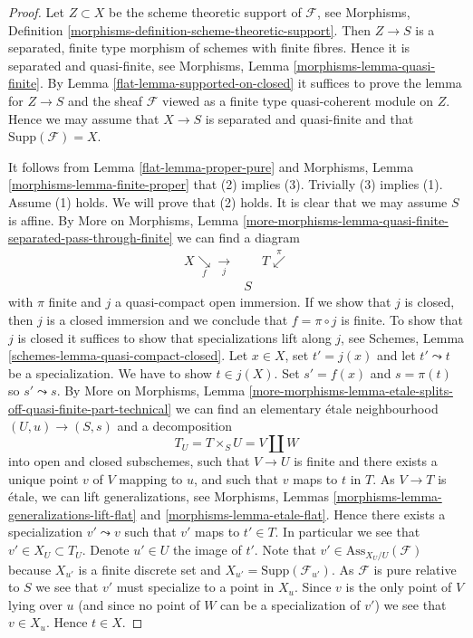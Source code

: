 \begin{proof}

Let $Z \subset X$ be the scheme theoretic support of $\mathcal{F}$, see
Morphisms, Definition \ref{morphisms-definition-scheme-theoretic-support}.
Then $Z \to S$ is a separated, finite type morphism of schemes with
finite fibres. Hence it is separated and quasi-finite, see
Morphisms, Lemma \ref{morphisms-lemma-quasi-finite}.
By
Lemma \ref{flat-lemma-supported-on-closed}
it suffices to prove the lemma for $Z \to S$ and the sheaf $\mathcal{F}$
viewed as a finite type quasi-coherent module on $Z$. Hence we may
assume that $X \to S$ is separated and quasi-finite and that
$\text{Supp}(\mathcal{F}) = X$.

\medskip\noindent
It follows from
Lemma \ref{flat-lemma-proper-pure}
and
Morphisms, Lemma \ref{morphisms-lemma-finite-proper}
that (2) implies (3). Trivially (3) implies (1). Assume (1) holds.
We will prove that (2) holds. It is clear that we may assume $S$ is affine. By
More on Morphisms,
Lemma \ref{more-morphisms-lemma-quasi-finite-separated-pass-through-finite}
we can find a diagram
$$
\begin{array}{ccc}X \underset{f}{\searrow}\underset{j}{\longrightarrow} &  & T \overset{\pi}{\swarrow} \\  & S & \end{array}
$$
with $\pi$ finite and $j$ a quasi-compact open immersion.
If we show that $j$ is closed, then $j$ is a closed immersion
and we conclude that $f = \pi \circ j$ is finite.
To show that $j$ is closed it suffices to show that specializations
lift along $j$, see
Schemes, Lemma \ref{schemes-lemma-quasi-compact-closed}.
Let $x \in X$, set $t' = j(x)$ and let $t' \leadsto t$ be a specialization.
We have to show $t \in j(X)$. Set $s' = f(x)$ and $s = \pi(t)$ so
$s' \leadsto s$. By
More on Morphisms, Lemma
\ref{more-morphisms-lemma-etale-splits-off-quasi-finite-part-technical}
we can find an elementary \'etale neighbourhood
$(U, u) \to (S, s)$ and a decomposition
$$
T_U = T \times_S U = V \amalg W
$$
into open and closed subschemes, such that $V \to U$ is finite and
there exists a unique point $v$ of $V$ mapping to $u$, and such that
$v$ maps to $t$ in $T$. As $V \to T$ is \'etale, we can lift
generalizations, see
Morphisms, Lemmas \ref{morphisms-lemma-generalizations-lift-flat} and
\ref{morphisms-lemma-etale-flat}.
Hence there exists a specialization $v' \leadsto v$ such that $v'$
maps to $t' \in T$. In particular we see that $v' \in X_U \subset T_U$.
Denote $u' \in U$ the image of $t'$. Note that
$v' \in \text{Ass}_{X_U/U}(\mathcal{F})$ because $X_{u'}$ is a finite
discrete set and $X_{u'} = \text{Supp}(\mathcal{F}_{u'})$.
As $\mathcal{F}$ is pure relative to $S$ we see that $v'$ must
specialize to a point in $X_u$. Since $v$ is the only point of
$V$ lying over $u$ (and since no point of $W$ can be a specialization
of $v'$) we see that $v \in X_u$. Hence $t \in X$.
\end{proof}

